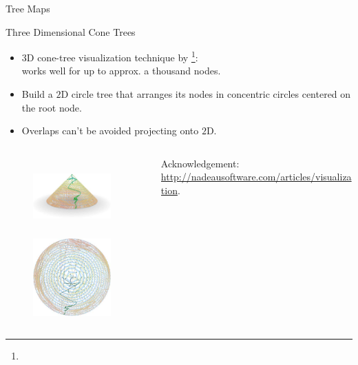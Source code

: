 \begin{frame}{Tree Maps}
  \centering
\end{frame}

\begin{frame}{Three Dimensional Cone Trees}
      \begin{itemize}
      \item $3$D cone-tree visualization technique by \citeauthor{robertson1991}\footnote{}:\\
        works well for up to approx. a thousand nodes.
      \item Build a $2$D circle tree that arranges its nodes in concentric circles centered on the root node.
      \item Overlaps can't be avoided projecting onto $2$D.
      \end{itemize}

      \begin{columns}[b]
        \begin{column}{0.7\textwidth}
          \vspace*{-1em}
          \begin{figure}
            \centering
        \includegraphics[width=3cm,height=3cm]{img/threedcone_one.jpg}\hspace{1cm}
        \includegraphics[width=3cm,height=3cm]{img/threedcone_two.jpg}\\
      \end{figure}
    \end{column}
    \begin{column}{0.3\textwidth}
            \tiny{Acknowledgement: \href{ttp://nadeausoftware.com/articles/visualization}{http://nadeausoftware.com/articles/visualization}.}
    \end{column}
      \end{columns}


  \end{frame}

